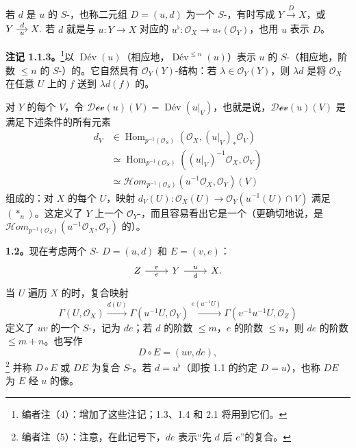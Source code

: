 若 $d$ 是 $u$ 的 $S$-，也称二元组 $D=(u,d)$ 为一个 $S$-，有时写成 $Y\xrightarrow{D}X$，或
$\begin{tikzcd}[cramped,column sep=small]Y\arrow[r,"d","u"']&X.\end{tikzcd}$
若 $d$ 就是与 $u:Y\to X$ 对应的 $u^\flat:\mathcal O_X\to u_*(\mathcal O_Y)$，也用 $u$ 表示 $D$。

\textbf{注记 1.1.3。}\footnote{编者注（4）：增加了这些注记；1.3、1.4 和 2.1 将用到它们。}以 $\operatorname{D\text{é}v}(u)$（相应地，$\operatorname{D\text{é}v}^{\leq n}(u)$）表示 $u$ 的 $S$-（相应地，阶数 $\leq n$ 的 $S$-）的。它自然具有 $\mathcal O_Y(Y)$-结构：若 $\lambda\in\mathcal O_Y(Y)$，则 $\lambda d$ 是将 $\mathcal O_X$ 在任意 $U$ 上的 $f$ 送到 $\lambda d(f)$ 的。

对 $Y$ 的每个 $V$，令 $\mathscr{D\!ev}(u)(V)=\operatorname{D\text{é}v}(u|_V)$，也就是说，$\mathscr{D\!ev}(u)(V)$ 是满足下述条件的所有元素
\[
\begin{aligned}
d_V&\in\operatorname{Hom}_{p^{-1}(\mathcal O_S)}(\mathcal O_X,(u|_V)_*\mathcal O_V)\\
&\simeq\operatorname{Hom}_{p^{-1}(\mathcal O_S)}((u|_V)^{-1}\mathcal O_X,\mathcal O_V)\\
&\simeq\mathcal Hom_{p^{-1}(\mathcal O_S)}(u^{-1}\mathcal O_X,\mathcal O_Y)(V)
\end{aligned}
\]
组成的：对 $X$ 的每个 $U$，映射 $d_V(U):\mathcal O_X(U)\to\mathcal O_Y(u^{-1}(U)\cap V)$ 满足 $(*_n)$。这定义了 $Y$ 上一个 $\mathcal O_Y$-，而且容易看出它是一个（更确切地说，是 $\mathcal Hom_{p^{-1}(\mathcal O_S)}(u^{-1}\mathcal O_X,\mathcal O_Y)$ 的）。

\textbf{1.2。}现在考虑两个 $S$- $D=(u,d)$ 和 $E=(v,e)$：
\[
\begin{tikzcd}Z\arrow[r,"v","e"']&Y\arrow[r,"u","d"']&X.\end{tikzcd}
\]
当 $U$ 遍历 $X$ 的时，复合映射
\[
\Gamma(U,\mathcal O_X)\xrightarrow{d(U)}\Gamma(u^{-1}U,\mathcal O_Y)\xrightarrow{e(u^{-1}U)}\Gamma(v^{-1}u^{-1}U,\mathcal O_Z)
\]
定义了 $uv$ 的一个 $S$-，记为 $de$；若 $d$ 的阶数 $\leq m$，$e$ 的阶数 $\leq n$，则 $de$ 的阶数 $\leq m+n$。也写作
\[
D\circ E=(uv,de),\tag{$\dagger$}
\]
\footnote{编者注（5）：注意，在此记号下，$de$ 表示“先 $d$ 后 $e$”的复合。}
并称 $D\circ E$ 或 $DE$ 为复合 $S$-。若 $d=u^\flat$（即按 1.1 的约定 $D=u$），也称 $DE$ 为 $E$ 经 $u$ 的像。


